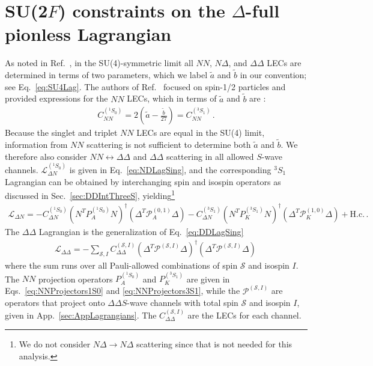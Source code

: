 \documentclass[nofootinbib, preprint, aps, prc, superscriptaddress,11pt]{revtex4-1}
\newcommand{\NN}{\ensuremath{N\!N}\xspace}
\newcommand{\oneS}{\ensuremath{{{}^{1}\!S_0}}\xspace}
\newcommand{\threeS}{\ensuremath{{{}^{3}\!S_1}}\xspace}
\newcommand\Swave{$S$-wave\xspace}
\newcommand{\calL}{\ensuremath{\mathcal{L}}}
\newcommand{\1}{\mathbbm{1}}
\newcommand{\CNNsing}{\ensuremath{C_{\NN}^{(^1 \! S_0)}}\xspace}
\newcommand{\CNDsing}{\ensuremath{C_{\Delta N}^{(^1 \! S_0)}}\xspace}
\newcommand{\CNNtrip}{\ensuremath{C_{\NN}^{(^3 \! S_1)}}\xspace}
\newcommand{\CNDtrip}{\ensuremath{C_{\Delta N}^{(^3 \! S_1)}}\xspace}
\newcommand{\at}{\ensuremath{\tilde{a}}\xspace}
\newcommand{\bt}{\ensuremath{\tilde{b}}\xspace}
\newcommand{\D}{\ensuremath{\Delta}\xspace}
\newcommand{\DD}{\ensuremath{\Delta\Delta}\xspace}
\newcommand{\ND}{\ensuremath{N\!\Delta}\xspace}
\begin{document}
\section{SU(2$F$) constraints on the \D-full pionless Lagrangian}
\label{sec:BBscattering}


As noted in Ref.~\cite{Kaplan:1995yg}, in the SU(4)-symmetric limit all $\NN$, \ND, and $\DD$ LECs are determined in terms of two parameters, which we label $\at$ and $\bt$ in our convention; see Eq.~\eqref{eq:SU4Lag}. 
The authors of Ref.~\cite{Kaplan:1995yg} focused on spin-1/2 particles and provided expressions for the $NN$ LECs, which in terms of \at and \bt are
\cite{Kaplan:1995yg}:
\begin{align}
\label{eq:CNNab}
    \CNNsing = 2 \left( \at - \frac{\bt}{27} \right) = \CNNtrip \, .
\end{align}
Because the singlet and triplet $NN$ LECs are equal in the SU(4) limit, information from \NN scattering is not sufficient to determine both \at and \bt.
We therefore also consider $\NN\leftrightarrow \DD$ and \DD scattering in all allowed \Swave channels.
$\calL_{\D N}^{(\oneS)}$ is given in Eq.~\eqref{eq:NDLagSing}, and the corresponding \threeS Lagrangian can be obtained by interchanging spin and isospin operators as discussed in Sec.~\ref{sec:DDIntThreeS}, yielding\footnote{We do not consider $N\D\to N\D$ scattering since that is not needed for this analysis.}
\begin{align} \label{eq:NDLagShort}
    \calL_{\D N} = -\CNDsing (N^T P^{(\oneS)}_A N)^\dagger (\Delta^T \mathscr{P}_A^{(0,1)} \Delta) 
    -\CNDtrip (N^T P^{(\threeS)}_K N)^\dagger (\Delta^T \mathscr{P}_{K}^{(1,0)} \Delta)+\text{H.c.} \, .
\end{align}
The \DD Lagrangian is the generalization of Eq.~\eqref{eq:DDLagSing} 
\begin{align} \label{eq:DDLagShort}
    \calL_{\DD} = -\sum_{\mathscr{S},I} C_{\DD}^{(\mathscr{S},I)}(\D^T \mathscr{P}^{(\mathscr{S},I)} \D)^\dagger (\D^T \mathscr{P}^{(\mathscr{S},I)} \D)\, 
\end{align}
where the sum runs over all Pauli-allowed combinations of spin $\mathscr{S}$ and isospin $I$.
The \NN projection operators $P^{(\oneS)}_A$ and $P^{(\threeS)}_K$ are given in Eqs.~\eqref{eq:NNProjectors1S0} and \eqref{eq:NNProjectors3S1}, while the $\mathscr{P}^{(\mathscr{S},I)}$ are operators that project onto \DD $S$-wave channels with total spin $\mathscr{S}$ and isospin $I$, given in App.~\ref{sec:AppLagrangians}.
The $C_{\DD}^{(\mathscr{S},I)}$ are the LECs for each channel.
\end{document}
